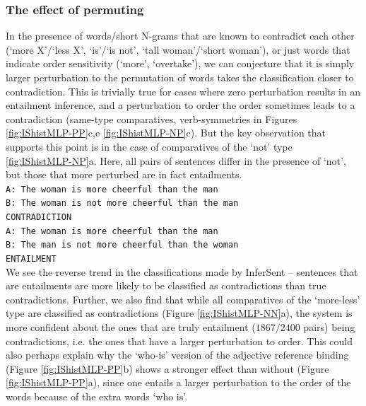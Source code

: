 \documentclass[10pt,letterpaper]{article}
\begin{document}
\subsubsection{The effect of permuting}
In the presence of words/short N-grams that are known to contradict each other (`more X'/`less X', `is'/`is not', `tall woman'/`short woman'), or just words that indicate order sensitivity (`more', `overtake'), we can conjecture that it is simply larger perturbation to the permutation of words takes the classification closer to contradiction. This is trivially true for cases where zero perturbation results in an entailment inference, and a perturbation to order the order sometimes leads to a contradiction (same-type comparatives, verb-symmetries in Figures \ref{fig:IShistMLP-PP}c,e \ref{fig:IShistMLP-NP}c). But the key observation that supports this point is in the case of comparatives of the `not' type \ref{fig:IShistMLP-NP}a. Here, all pairs of sentences differ in the presence of `not', but those that more perturbed are in fact entailments. \\
{\tt A: The woman is more cheerful than the man \\ B: The woman is not more cheerful than the man\\ CONTRADICTION \\}{\tt A: The woman is more cheerful than the man \\ B: The man is not more cheerful than the woman \\ ENTAILMENT} \\
We see the reverse trend in the classifications made by InferSent – sentences that are entailments are more likely to be classified as contradictions than true contradictions. Further, we also find that while all comparatives of the `more-less' type are classified as contradictions (Figure \ref{fig:IShistMLP-NN}a), the system is more confident about the ones that are truly entailment ($1867/2400$ pairs) being contradictions, i.e. the ones that have a larger perturbation to order. This could also perhaps explain why the `who-is' version of the adjective reference binding (Figure \ref{fig:IShistMLP-PP}b) shows a stronger effect than without (Figure \ref{fig:IShistMLP-PP}a), since one entails a larger perturbation to the order of the words because of the extra words `who is'.

\end{document}
